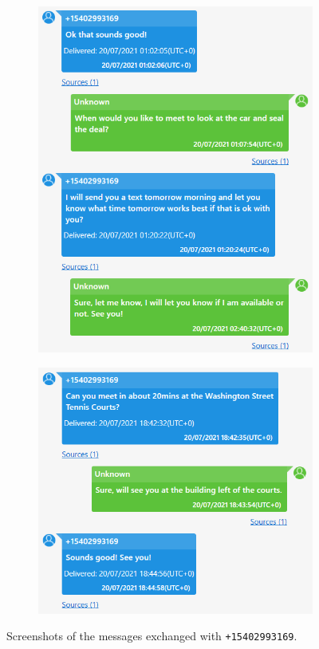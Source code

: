 \documentclass[12pt]{article}
\begin{document}
\begin{figure}[!ht]
\begin{subfigure}[b]{0.3\textwidth}
        \includegraphics[width=\textwidth]{images/ss5.png}
        \caption{}
    \end{subfigure}
    \hspace{2 pt}
    \begin{subfigure}[b]{0.3\textwidth}
        \centering
        \includegraphics[width=\textwidth]{images/ss6-meeting.png}
        \caption{}
    \label{fig:meeting}
    \end{subfigure}
    \caption{Screenshots of the messages exchanged with \texttt{+15402993169}.}
    \label{fig:messages}
\end{figure}
\end{document}
